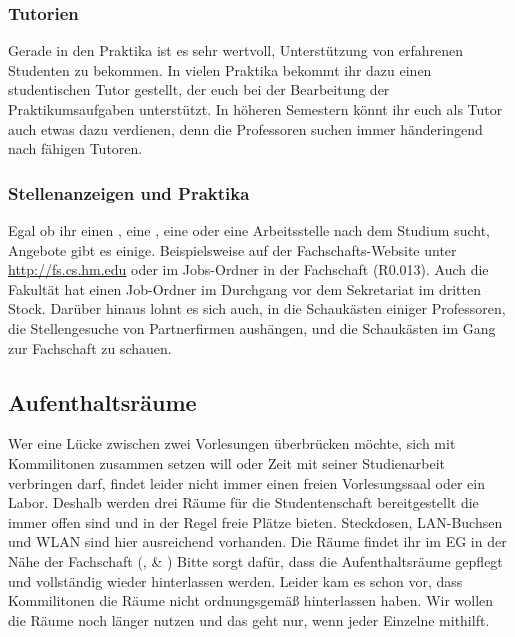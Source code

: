 \subsubsection{Tutorien}
Gerade in den Praktika ist es sehr wertvoll, Unterstützung von 
erfahrenen Studenten zu bekommen. In vielen Praktika bekommt ihr 
dazu einen studentischen Tutor gestellt, der euch bei der Bearbeitung 
der Praktikumsaufgaben unterstützt. \doublebreak
In höheren Semestern könnt ihr euch als Tutor auch etwas dazu 
verdienen, denn die Professoren suchen immer händeringend nach 
fähigen Tutoren. 

\subsubsection{Stellenanzeigen und Praktika}
Egal ob ihr einen , eine , 
eine  oder eine Arbeitsstelle nach dem 
Studium sucht, Angebote gibt es einige. Beispielsweise auf der 
Fachschafts-Website unter \url{http://fs.cs.hm.edu} \arrow {} \arrow {} oder im
Jobs-Ordner in der Fachschaft (R0.013). Auch die Fakultät hat einen Job-Ordner im Durchgang vor dem Sekretariat im dritten Stock. Darüber 
hinaus lohnt es sich auch, in die Schaukästen einiger Professoren, die
Stellengesuche von Partnerfirmen aushängen, und die Schaukästen im Gang zur Fachschaft zu schauen.

\subsection{Aufenthaltsräume}
Wer eine Lücke zwischen zwei Vorlesungen überbrücken möchte, sich mit Kommilitonen
zusammen setzen will oder Zeit mit seiner Studienarbeit verbringen darf, findet leider nicht
immer einen freien Vorlesungssaal oder ein Labor. 
Deshalb werden drei Räume für die Studentenschaft bereitgestellt die 
immer offen sind und in der Regel freie Plätze bieten. Steckdosen, LAN-Buchsen und WLAN sind hier ausreichend vorhanden. Die Räume findet 
ihr im EG in der Nähe der Fachschaft (,  \& )
Bitte sorgt dafür, dass die Aufenthaltsräume gepflegt und vollständig wieder hinterlassen werden.
Leider kam es schon vor, dass Kommilitonen die Räume nicht ordnungsgemäß hinterlassen haben.
Wir wollen die Räume noch länger nutzen und das geht nur, wenn jeder Einzelne mithilft.